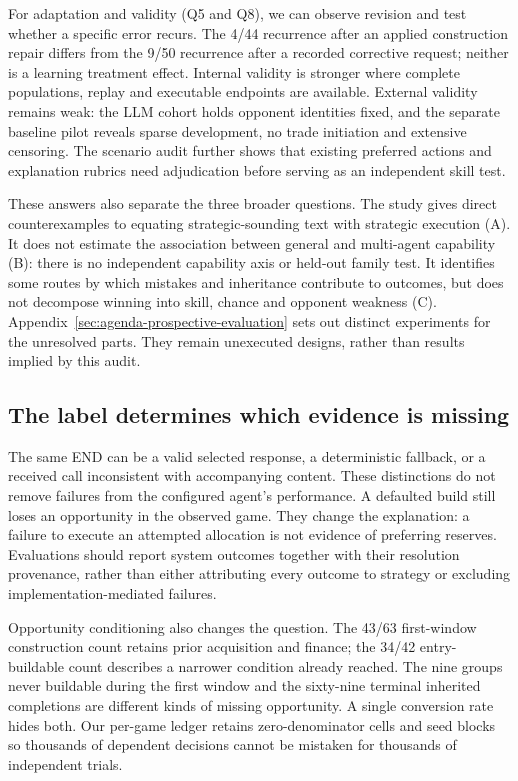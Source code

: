 For adaptation and validity (Q5 and Q8), we can observe revision and test whether a specific error recurs. The 4/44 recurrence after an applied construction repair differs from the 9/50 recurrence after a recorded corrective request; neither is a learning treatment effect. Internal validity is stronger where complete populations, replay and executable endpoints are available. External validity remains weak: the LLM cohort holds opponent identities fixed, and the separate baseline pilot reveals sparse development, no trade initiation and extensive censoring. The scenario audit further shows that existing preferred actions and explanation rubrics need adjudication before serving as an independent skill test.

These answers also separate the three broader questions. The study gives direct counterexamples to equating strategic-sounding text with strategic execution (A). It does not estimate the association between general and multi-agent capability (B): there is no independent capability axis or held-out family test. It identifies some routes by which mistakes and inheritance contribute to outcomes, but does not decompose winning into skill, chance and opponent weakness (C). Appendix~\ref{sec:agenda-prospective-evaluation} sets out distinct experiments for the unresolved parts. They remain unexecuted designs, rather than results implied by this audit.

\subsection{The label determines which evidence is missing}

The same END can be a valid selected response, a deterministic fallback, or a received call inconsistent with accompanying content. These distinctions do not remove failures from the configured agent's performance. A defaulted build still loses an opportunity in the observed game. They change the explanation: a failure to execute an attempted allocation is not evidence of preferring reserves. Evaluations should report system outcomes together with their resolution provenance, rather than either attributing every outcome to strategy or excluding implementation-mediated failures.

Opportunity conditioning also changes the question. The 43/63 first-window construction count retains prior acquisition and finance; the 34/42 entry-buildable count describes a narrower condition already reached. The nine groups never buildable during the first window and the sixty-nine terminal inherited completions are different kinds of missing opportunity. A single conversion rate hides both. Our per-game ledger retains zero-denominator cells and seed blocks so thousands of dependent decisions cannot be mistaken for thousands of independent trials.

